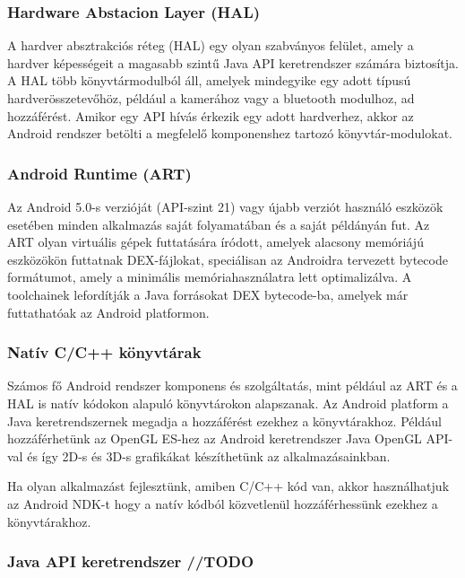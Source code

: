 \documentclass[../main.tex]{subfiles}
\begin{document}
        \subsubsection{Hardware Abstacion Layer (HAL)}
             A hardver absztrakciós réteg (HAL) egy olyan szabványos felület, amely a hardver képességeit a magasabb szintű Java API keretrendszer számára biztosítja. A HAL több könyvtármodulból áll,  amelyek mindegyike egy adott típusú hardverösszetevőhöz, például a kamerához vagy a bluetooth modulhoz, ad hozzáférést. Amikor egy API hívás érkezik egy adott hardverhez, akkor az Android rendszer betölti a megfelelő komponenshez tartozó könyvtár-modulokat.
            
        \subsubsection{Android Runtime (ART)}
            Az Android 5.0-s verzióját (API-szint 21) vagy újabb verziót használó eszközök esetében minden alkalmazás saját folyamatában és a saját példányán fut. Az ART olyan virtuális gépek futtatására íródott, amelyek alacsony memóriájú eszközökön futtatnak DEX-fájlokat, speciálisan az Androidra tervezett bytecode formátumot, amely a minimális memóriahasználatra lett optimalizálva. A toolchainek lefordítják a Java forrásokat DEX bytecode-ba, amelyek már futtathatóak az Android platformon.
            
        \subsubsection{Natív C/C++ könyvtárak}
            Számos fő Android rendszer komponens és szolgáltatás, mint például az ART és a HAL is natív kódokon alapuló könyvtárokon alapszanak. Az Android platform a Java keretrendszernek megadja a hozzáférést ezekhez a könyvtárakhoz. Például hozzáférhetünk az OpenGL ES-hez az Android keretrendszer Java OpenGL API-val és így 2D-s és 3D-s grafikákat készíthetünk az alkalmazásainkban.
            
            Ha olyan alkalmazást fejlesztünk, amiben C/C++ kód van, akkor használhatjuk az Android NDK-t hogy a natív kódból közvetlenül hozzáférhessünk ezekhez a könyvtárakhoz.
            
        \subsubsection{Java API keretrendszer //TODO}
            
\end{document}
